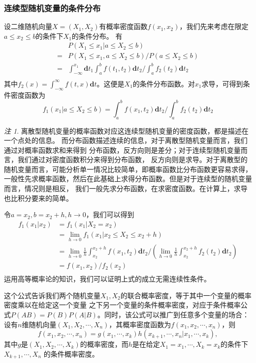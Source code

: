 \documentclass[a4paper,11pt]{article}%
\theoremstyle{remark}
\newtheorem*{remark}{注}
\theoremstyle{remark}
\theoremstyle{definition}
\theoremstyle{definition}
\theoremstyle{plain}
\begin{document}
\subsubsection{连续型随机变量的条件分布}
设二维随机向量$X=(X_1,X_2)$有概率密度函数$f(x_1,x_2)$，我们先来考虑在限定$a\leq x_2\leq b$的条件下$X_1$的条件分布。
有 
\[
\begin{array}{rl}
&P(X_1\leq x_1|a\leq X_2\leq b)\\
=&P(X_1\leq x_1,a\leq X_2\leq b)/P(a\leq X_2\leq b)\\
=&\int^{x_1}_{-\infty}\mathbf{d}t_1\int^b_af(t_1,t_2)\mathbf{d}t_2/\int_{a}^{b}f_2(t_2)\mathbf{d}t_2\\
\end{array}
\]
其中$f_2(x)=\int_{-\infty}^{\infty}f(t,x)\mathbf{d}t$。这便是$X_1$的条件分布函数。对$x_1$求导，可得到条件密度函数为
\[f_1(x_1|a\leq X_2\leq b)=\int_{a}^{b}f(x_1,t_2)\mathbf{d}t_2/\int_{a}^{b}f_2(t_2)\mathbf{d}t_2\]
\begin{remark}
    离散型随机变量的概率函数对应这连续型随机变量的密度函数，都是描述在一个点处的信息。
    而分布函数描述连续的信息，对于离散型随机变量而言，我们通过对概率函数求和来得到
    分布函数，反方向则是差分；对于连续型随机变量而言，我们通过对密度函数积分来得到分布函数，
    反方向则是求导。对于离散型的随机变量而言，可能分析单一情况比较简单，即概率函数比分布函数更容易求得，
    一般性先求概率函数，然后在此基础上求得分布函数。但是对于连续型的随机变量而言，情况则是相反，
    我们一般先求分布函数，在求密度函数。在计算上，求导也比积分要来的简单。
\end{remark}
令$a=x_2,b=x_2+h,h\rightarrow 0$，我们可以得到
\[
    \begin{array}{rl}
        f_1(x_1|x_2)&=f_1(x_1|X_2=x_2)\\
                    &=\lim_{h\rightarrow 0}f_1(x_1|x_2\leq X_2\leq x_2+h)\\
                    &=\lim_{h\rightarrow 0}\frac{1}{h}\int_{x_2}^{x_2+h}f(x_1,t_2)\mathbf{d}t_2/(\lim_{h\rightarrow 0}\frac{1}{h}\int_{x_2}^{x_2+h}f_2(t_2)\mathbf{d}t_2)\\
                    &=f(x_1,x_2)/f_2(x_2)\\
    \end{array}\]
    运用高等概率论的知识，我们可以证明上式的成立无需连续性条件。

    这个公式告诉我们两个随机变量$X_1,X_2$的联合概率密度，等于其中一个变量的概率密度乘以在给定这一个变量
    之下另一个变量的条件概率密度，对应于条件概率公式$P(AB)=P(B)P(A|B)$。同时，该公式可以推广到任意多个变量的场合：
    设有$n$维随机向量$(X_1,X_2,\cdots,X_n)$，其概率密度函数为$f(x_1,x_2,\cdots,x_n)$，则
    \[f(x_1,x_2,\cdots,x_n)=g(x_1,\cdots,x_k)h(x_{k+1},\cdots,x_n|x_1,\cdots,x_k),\]
    其中$g$是$(X_1,X_2,\cdots,X_k)$的概率密度，而$h$是在给定$X_1=x_1,\cdots,X_k=x_k$的条件下$X_{k+1},\cdots,X_n$
    的条件概率密度。
\end{document}
